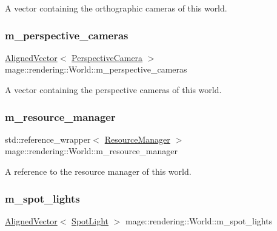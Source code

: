 A vector containing the orthographic cameras of this world. \hypertarget{classmage_1_1rendering_1_1_world_a20712094ac433ad1651b0c7730bba96b}{}\label{classmage_1_1rendering_1_1_world_a20712094ac433ad1651b0c7730bba96b} 
\subsubsection{\texorpdfstring{m\+\_\+perspective\+\_\+cameras}{m\_perspective\_cameras}}
{\footnotesize\ttfamily \hyperlink{namespacemage_a8664bfb5ce2179fc64eae9f82c8a5ba8}{Aligned\+Vector}$<$ \hyperlink{classmage_1_1rendering_1_1_perspective_camera}{Perspective\+Camera} $>$ mage\+::rendering\+::\+World\+::m\+\_\+perspective\+\_\+cameras\hspace{0.3cm}{\ttfamily [private]}}

A vector containing the perspective cameras of this world. \hypertarget{classmage_1_1rendering_1_1_world_a89edf9b86ab3a8644c15e7f521e8642a}{}\label{classmage_1_1rendering_1_1_world_a89edf9b86ab3a8644c15e7f521e8642a} 
\subsubsection{\texorpdfstring{m\+\_\+resource\+\_\+manager}{m\_resource\_manager}}
{\footnotesize\ttfamily std\+::reference\+\_\+wrapper$<$ \hyperlink{classmage_1_1rendering_1_1_resource_manager}{Resource\+Manager} $>$ mage\+::rendering\+::\+World\+::m\+\_\+resource\+\_\+manager\hspace{0.3cm}{\ttfamily [private]}}

A reference to the resource manager of this world. \hypertarget{classmage_1_1rendering_1_1_world_a6ea472361d7d1a6a829a9270913059c2}{}\label{classmage_1_1rendering_1_1_world_a6ea472361d7d1a6a829a9270913059c2} 
\subsubsection{\texorpdfstring{m\+\_\+spot\+\_\+lights}{m\_spot\_lights}}
{\footnotesize\ttfamily \hyperlink{namespacemage_a8664bfb5ce2179fc64eae9f82c8a5ba8}{Aligned\+Vector}$<$ \hyperlink{classmage_1_1rendering_1_1_spot_light}{Spot\+Light} $>$ mage\+::rendering\+::\+World\+::m\+\_\+spot\+\_\+lights\hspace{0.3cm}{\ttfamily [private]}}

